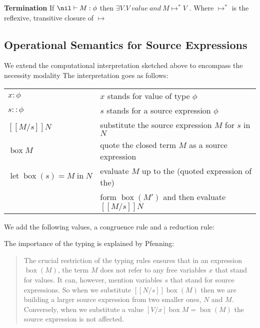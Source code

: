 \begin{mdframed}  
\textbf{Termination}
 If $\nil\vdash M:\phi$ then $\exists V. V \ value\  and \  M\mapsto ^{*} V$ . Where $\mapsto^{*}$ is the reflexive, transitive closure of $\mapsto$ 
 \end{mdframed}
 \subsection{Operational Semantics for Source Expressions}
 We extend the computational interpretation sketched above to encompass the necessity modality
 The interpretation  goes as follows:
 \begin{mdframed}
 \begin{tabular}{l l}
	 $x:\phi$ & $x$ stands for value of type $\phi$ \\
	$s::\phi$ & $s$ stands for a source expression $\phi$ \\
    $[\![ M/s ]\!]N$ & substitute the source expression $M$ for $s$ in $N$  \\
    $\operatorname{box} M$ & quote the closed term $M$ as a source expression \\
    $\operatorname{let}\operatorname{box} (s)=M \operatorname{in} N$ & evaluate $M$ up to the (quoted expression of the)\\ 
    & form $\operatorname{box}(M')$ and then evaluate   $[\![ M/s ]\!]N$\\ 
\end{tabular}
\end{mdframed}

We add the following values, a congruence rule and a reduction rule:
 \begin{mdframed}
 \end{mdframed}
 The importance of the typing is explained by Pfenning:
 \begin{quote}
 The crucial restriction of the typing rules ensures that in an expression $\operatorname{box}(M)$, the term
 $M$ does not refer to  any free variables $x$ that stand for values. It can, however, mention variables
 $s$ that stand for source expressions. So when we substitute
 $[\![N/s]\!] \operatorname{box}(M)$ then we are building a larger source expression from two smaller ones,
 $N$ and $M$.  Conversely, when we substitute a value
 $[V/x]\operatorname{box}M=\operatorname{box}(M)$ the source expression is not
 affected.
 \end{quote}
 
